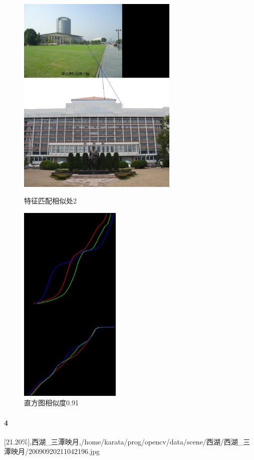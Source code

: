 \begin{figure}[htb]
\begin{minipage}[t]{0.5\linewidth}
\centering
\includegraphics[height=3.8in]{紫金港图书馆.jpg.d/im3sift.jpg}
\caption{特征匹配相似处2}
\label{fig:side:a}
\end{minipage}%
\begin{minipage}[t]{0.5\linewidth}
\centering
\includegraphics[height=3.8in]{紫金港图书馆.jpg.d/im3hist2.jpg}
\caption{直方图相似度0.91}
\label{fig:side:a}
\end{minipage}%
\end{figure}

\clearpage
\paragraph{4}
[21.20\%],西湖_三潭映月,/home/karata/prog/opencv/data/scene/西湖/西湖_三潭映月/20090920211042196.jpg


